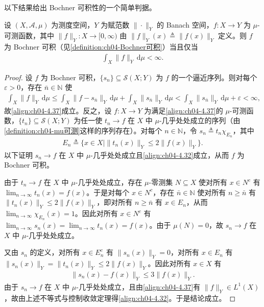 \documentclass[../../main.tex]{subfiles}%
\begin{document}
以下结果给出 Bochner 可积性的一个简单判据。

\begin{proposition}\label{proposition:ch04-Bochner判据}\label{proposition:ch04-4.4.16}
设 $(X,\mathcal{A},\mu)$ 为测度空间，$Y$ 为赋范数 $\|\cdot\|_Y$ 的 Banach 空间，$f:X\to Y$ 为 $\mu$-可测函数，其中 $\|f\|_Y:X\to[0,\infty)$ 由 $\|f\|_Y(x)\triangleq\|f(x)\|_Y$ 定义。则 $f$ 为 Bochner 可积（见\cref{definition:ch04-Bochner可积}）当且仅当
\begin{align}
\int_X\|f\|_Y\,\mathrm{d}\mu<\infty. \label{align:ch04-4.37}
\end{align}
\end{proposition}

\begin{proof}
设 $f$ 为 Bochner 可积，$\{s_n\}\subseteq\mathcal{S}(X;Y)$ 为 $f$ 的一个逼近序列。则对每个 $\varepsilon>0$，存在 $\bar n\in\mathbb{N}$ 使
\begin{align*}
\int_X\|f\|_Y\,\mathrm{d}\mu\leqslant\int_X\|f-s_{\bar n}\|_Y\,\mathrm{d}\mu+\int_X\|s_{\bar n}\|_Y\,\mathrm{d}\mu<\int_X\|s_{\bar n}\|_Y\,\mathrm{d}\mu+\varepsilon<\infty,
\end{align*}
故\eqref{align:ch04-4.37}成立。反之，设 $f:X\to Y$ 为满足\eqref{align:ch04-4.37}的 $\mu$-可测函数，$\{t_n\}\subseteq\mathcal{S}(X;Y)$ 为任一使 $t_n\to f$ 在 $X$ 中 $\mu$-几乎处处成立的序列（由\cref{definition:ch04-mu可测}这样的序列存在）。对每个 $n\in\mathbb{N}$，令 $s_n\triangleq t_n\chi_{E_n}$，其中
\begin{align*}
E_n\triangleq \{x\in X\mid\|t_n(x)\|_Y\leqslant2\|f(x)\|_Y\}.
\end{align*}
以下证明 $s_n\to f$ 在 $X$ 中 $\mu$-几乎处处成立且\eqref{align:ch04-4.32}成立，从而 $f$ 为 Bochner 可积。

由于 $t_n\to f$ 在 $X$ 中 $\mu$-几乎处处成立，存在 $\mu$-零测集 $N\subseteq X$ 使对所有 $x\in N^c$ 有 $\lim_{n\to\infty}t_n(x)=f(x)$。于是对每个 $x\in N^c$，存在 $\bar n\in\mathbb{N}$ 使对所有 $n\geqslant\bar n$ 有 $\|t_n(x)\|_Y\leqslant2\|f(x)\|_Y$，即对所有 $n\geqslant\bar n$ 有 $x\in E_n$，从而 $\lim_{n\to\infty}\chi_{E_n}(x)=1$。因此对所有 $x\in N^c$ 有 $\lim_{n\to\infty}s_n(x)=\lim_{n\to\infty}t_n(x)=f(x)$。由于 $\mu(N)=0$，故 $s_n\to f$ 在 $X$ 中 $\mu$-几乎处处成立。

又由 $s_n$ 的定义，对所有 $x\in E_n^c$ 有 $\|s_n(x)\|_Y=0$，对所有 $x\in E_n$ 有 $\|s_n(x)\|_Y=\|t_n(x)\|_Y\leqslant2\|f(x)\|_Y$。因此对所有 $x\in X$ 有
\begin{align*}
\|s_n(x)-f(x)\|_Y\leqslant3\|f(x)\|_Y.
\end{align*}
由于 $s_n\to f$ 在 $X$ 中 $\mu$-几乎处处成立，且由\eqref{align:ch04-4.37}有 $\|f\|_Y\in L^1(X)$，故由上述不等式与控制收敛定理得\eqref{align:ch04-4.32}。于是结论成立。
\end{proof}
\end{document}
